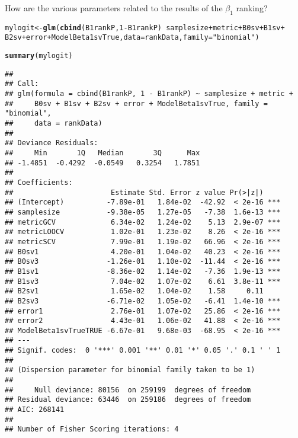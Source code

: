 \documentclass{article}\usepackage[]{graphicx}\usepackage[]{color}
\makeatletter
\newcommand{\hlnum}[1]{\textcolor[rgb]{0.686,0.059,0.569}{#1}}%
\newcommand{\hlstr}[1]{\textcolor[rgb]{0.192,0.494,0.8}{#1}}%
\newcommand{\hlopt}[1]{\textcolor[rgb]{0,0,0}{#1}}%
\newcommand{\hlstd}[1]{\textcolor[rgb]{0.345,0.345,0.345}{#1}}%
\newcommand{\hlkwb}[1]{\textcolor[rgb]{0.69,0.353,0.396}{#1}}%
\newcommand{\hlkwc}[1]{\textcolor[rgb]{0.333,0.667,0.333}{#1}}%
\newcommand{\hlkwd}[1]{\textcolor[rgb]{0.737,0.353,0.396}{\textbf{#1}}}%
\newenvironment{kframe}{%
 \def\at@end@of@kframe{}%
 \ifinner\ifhmode%
  \def\at@end@of@kframe{\end{minipage}}%
  \begin{minipage}{\columnwidth}%
 \fi\fi%
 \def\FrameCommand##1{\hskip\@totalleftmargin \hskip-\fboxsep
 \colorbox{shadecolor}{##1}\hskip-\fboxsep
     \hskip-\linewidth \hskip-\@totalleftmargin \hskip\columnwidth}%
 \MakeFramed {\advance\hsize-\width
   \@totalleftmargin\z@ \linewidth\hsize
   \@setminipage}}%
 {\par\unskip\endMakeFramed%
 \at@end@of@kframe}
\newenvironment{knitrout}{}{} %
\makeatother
\begin{document}
How are the various parameters related to the results of the $\beta _1$ ranking?
\begin{knitrout}
\color{fgcolor}\begin{kframe}
\begin{alltt}
\hlstd{mylogit} \hlkwb{<-} \hlkwd{glm}\hlstd{(}\hlkwd{cbind}\hlstd{(B1rankP,} \hlnum{1} \hlopt{-} \hlstd{B1rankP)} \hlopt{~} \hlstd{samplesize} \hlopt{+} \hlstd{metric} \hlopt{+} \hlstd{B0sv} \hlopt{+} \hlstd{B1sv} \hlopt{+}
    \hlstd{B2sv} \hlopt{+} \hlstd{error} \hlopt{+} \hlstd{ModelBeta1svTrue,} \hlkwc{data} \hlstd{= rankData,} \hlkwc{family} \hlstd{=} \hlstr{"binomial"}\hlstd{)}
\end{alltt}


{\ttfamily\noindent\color{warningcolor}{\#\# Warning: non-integer counts in a binomial glm!}}\begin{alltt}
\hlkwd{summary}\hlstd{(mylogit)}
\end{alltt}
\begin{verbatim}
## 
## Call:
## glm(formula = cbind(B1rankP, 1 - B1rankP) ~ samplesize + metric + 
##     B0sv + B1sv + B2sv + error + ModelBeta1svTrue, family = "binomial", 
##     data = rankData)
## 
## Deviance Residuals: 
##     Min       1Q   Median       3Q      Max  
## -1.4851  -0.4292  -0.0549   0.3254   1.7851  
## 
## Coefficients:
##                       Estimate Std. Error z value Pr(>|z|)    
## (Intercept)          -7.89e-01   1.84e-02  -42.92  < 2e-16 ***
## samplesize           -9.38e-05   1.27e-05   -7.38  1.6e-13 ***
## metricGCV             6.34e-02   1.24e-02    5.13  2.9e-07 ***
## metricLOOCV           1.02e-01   1.23e-02    8.26  < 2e-16 ***
## metricSCV             7.99e-01   1.19e-02   66.96  < 2e-16 ***
## B0sv1                 4.20e-01   1.04e-02   40.23  < 2e-16 ***
## B0sv3                -1.26e-01   1.10e-02  -11.44  < 2e-16 ***
## B1sv1                -8.36e-02   1.14e-02   -7.36  1.9e-13 ***
## B1sv3                 7.04e-02   1.07e-02    6.61  3.8e-11 ***
## B2sv1                 1.65e-02   1.04e-02    1.58     0.11    
## B2sv3                -6.71e-02   1.05e-02   -6.41  1.4e-10 ***
## error1                2.76e-01   1.07e-02   25.86  < 2e-16 ***
## error2                4.43e-01   1.06e-02   41.88  < 2e-16 ***
## ModelBeta1svTrueTRUE -6.67e-01   9.68e-03  -68.95  < 2e-16 ***
## ---
## Signif. codes:  0 '***' 0.001 '**' 0.01 '*' 0.05 '.' 0.1 ' ' 1
## 
## (Dispersion parameter for binomial family taken to be 1)
## 
##     Null deviance: 80156  on 259199  degrees of freedom
## Residual deviance: 63446  on 259186  degrees of freedom
## AIC: 268141
## 
## Number of Fisher Scoring iterations: 4
\end{verbatim}
\end{kframe}
\end{knitrout}
\end{document}
